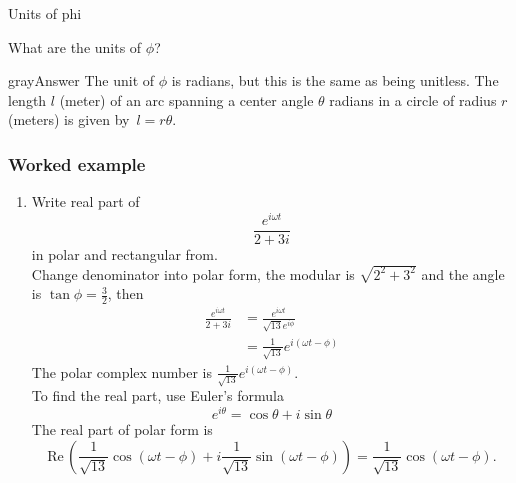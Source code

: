\begin{exercise}
  Units of phi
\end{exercise}
What are the units of $\phi$?
\begin{mybox}{gray}{Answer}
  The unit of $\phi$ is radians, but this is the same as being unitless.
  The length $l$ (meter) of an arc spanning a center angle $\theta$
  radians in a circle of radius $r$ (meters) is given by $\, l=r\theta .$
\end{mybox}
\clearpage


\subsubsection{Worked example}

\begin{enumerate}
\item Write real part of
  \begin{equation*}
    \displaystyle \frac{e^{i \omega t}}{2 + 3i}
  \end{equation*}
  in polar and rectangular from.\\

  Change denominator into polar form, the modular is $\displaystyle \sqrt{2^2 + 3^2}$
  and the angle is $\displaystyle \tan \phi = \frac{3}{2}$, then
  \begin{align*}
    \displaystyle \frac{e^{i \omega t}}{2 + 3i}
    &\displaystyle = \displaystyle \frac{e^{i \omega t}}{\sqrt{13} e^{i \phi}} \\
    &\displaystyle = \displaystyle \frac{1}{\sqrt{13}} e^{i(\omega t - \phi)}
  \end{align*}
  The polar complex number is $\displaystyle \frac{1}{\sqrt{13}} e^{i(\omega t - \phi)}$.\\
  To find the real part, use Euler's formula
  \begin{equation*}
    e^{i \theta} = \cos \theta + i \sin \theta
  \end{equation*}
  The real part of polar form is 
  \begin{equation*}
    \displaystyle \mathrm{Re\, } \left( \frac{1}{\sqrt{13}} \cos (\omega t - \phi)  +
      i \frac{1}{\sqrt{13}} \sin (\omega t - \phi) \right)
    \displaystyle = \frac{1}{\sqrt{13}} \cos (\omega t - \phi). 
  \end{equation*}


\end{enumerate}
